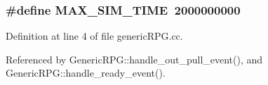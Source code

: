 \subsubsection[{MAX\_\-SIM\_\-TIME}]{\setlength{\rightskip}{0pt plus 5cm}\#define MAX\_\-SIM\_\-TIME~2000000000}\label{genericRPG_8cc_d8e040466c3a1ce9fc07153e7360ba21}




Definition at line 4 of file genericRPG.cc.

Referenced by GenericRPG::handle\_\-out\_\-pull\_\-event(), and GenericRPG::handle\_\-ready\_\-event().